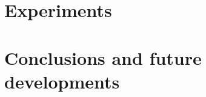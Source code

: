 \documentclass{Configuration_Files/PoliMi3i_thesis}
\begin{document}
\chapter{Experiments}\label{ch:experiments}


\chapter{Conclusions and future developments}\label{ch:conclusions}





\cleardoublepage
{} %



\listoffigures

\listoftables

\end{document}
